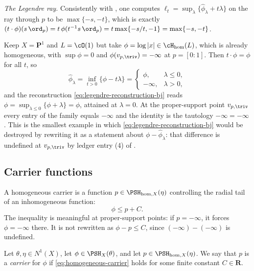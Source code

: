 \begin{example}
\emph{The Legendre ray.}  Consistently with
, one computes
$\ell_t=\sup_\lambda\{\widehat\phi_\lambda+t\lambda\}$ on the ray through
$p$ to be $\max\{-s,-t\}$, which is exactly
$(t\cdot\phi)(s\,\ord_p)=t\,\phi(t^{-1}s\,\ord_p)
=t\max\{-s/t,-1\}=\max\{-s,-t\}$.
\end{example}

\begin{example}
\label{ex:ch35-test-curve-infinite}
Keep $X=\mathbf P^1$ and $L=\cO(1)$ but take
$\phi=\log|x|\in\cH_{\mathrm{hom}}(L)$, which is already homogeneous, with
$\sup\phi=0$ and $\phi(v_{p,\triv})=-\infty$ at $p=[0:1]$.  Then
$t\cdot\phi=\phi$ for all $t$, so
\[
 \widehat\phi_\lambda=\inf_{t>0}\{\phi-t\lambda\}=
 \begin{cases}
  \phi,&\lambda\leq0,\\
  -\infty,&\lambda>0,
 \end{cases}
\]
and the reconstruction \eqref{eq:legendre-reconstruction-bj} reads
$\phi=\sup_{\lambda\leq0}\{\phi+\lambda\}=\phi$, attained at
$\lambda=0$.  At the proper-support point $v_{p,\triv}$ every entry of
the family equals $-\infty$ and the identity is the tautology
$-\infty=-\infty$.  This is the smallest example in which
\eqref{eq:legendre-reconstruction-bj} would be destroyed by rewriting it as
a statement about $\phi-\widehat\phi_\lambda$: that difference is
undefined at $v_{p,\triv}$ by ledger entry (4) of
.
\end{example}

\subsection{Carrier functions}
\label{sec:ch35-carriers}

A homogeneous carrier is a function
$p\in\PSH_{\mathrm{hom},X}(\eta)$ controlling the radial tail of an
inhomogeneous function:
\begin{equation}
\label{eq:homogeneous-carrier}
                         \phi\leq p+C.
\end{equation}
The inequality is meaningful at proper-support points: if $p=-\infty$,
it forces $\phi=-\infty$ there.  It is not rewritten as
$\phi-p\leq C$, since $(-\infty)-(-\infty)$ is undefined.

\begin{definition}[Carrier]
\label{def:ch35-carrier}
Let $\theta,\eta\in N^1(X)$, let $\phi\in\PSH_X(\theta)$, and let
$p\in\PSH_{\mathrm{hom},X}(\eta)$.  We say that $p$ is a
\emph{carrier} for $\phi$ if \eqref{eq:homogeneous-carrier} holds for some
finite constant $C\in\mathbf R$.
\end{definition}

